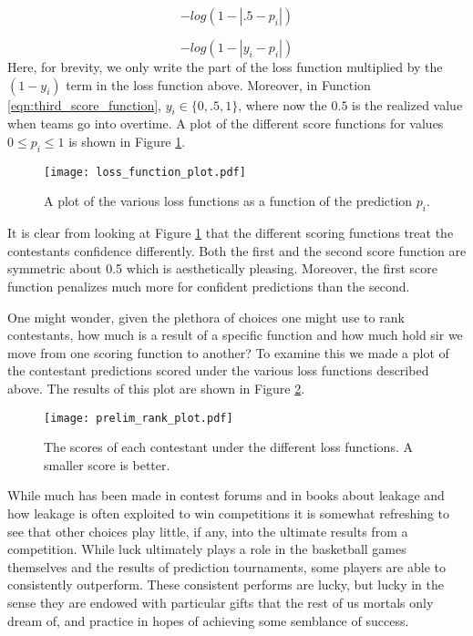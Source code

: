 \begin{equation}\label{eqn:second_score_function}
-log(1-|.5-p_i|)
\end{equation} 

\begin{equation}\label{eqn:third_score_function}
-log(1-|y_i-p_i|)
\end{equation} 
Here, for brevity, we only write the part of the loss function multiplied by the $(1-y_i)$ term in the loss function above. Moreover, in Function \ref{eqn:third_score_function}, $y_i \in \{0,.5,1\}$, where now the $0.5$ is the realized value when teams go into overtime. A plot of the different score functions for values $0\leq p_i \leq 1$ is shown in Figure \ref{fig:scoring_functions}.  

\begin{figure}[h]
\centering
\texttt{[image: loss\_function\_plot.pdf]}
\caption{A plot of the various loss functions as a function of the prediction $p_i$.  }
\label{fig:scoring_functions}
\end{figure}

It is clear from looking at Figure \ref{fig:scoring_functions} that the different scoring functions treat the contestants confidence differently. Both the first and the second score function are symmetric about 0.5 which is aesthetically pleasing. Moreover, the first score function penalizes much more for confident predictions than the second. 

One might wonder, given the plethora of choices one might use to rank contestants, how much is a result of a specific function and how much hold sir we move from one scoring function to another? To examine this we made a plot of the contestant predictions scored under the various loss functions described above. The results of this plot are shown in Figure \ref{fig:score_rank_plot}. 

  \begin{figure}[h]
\centering
\texttt{[image: prelim\_rank\_plot.pdf]}
\caption{The scores of each contestant under the different loss functions. A smaller score is better.  }
\label{fig:score_rank_plot}
\end{figure}


While much has been made in contest forums and in books \cite{schutt2013doing} about leakage and how leakage is often exploited to win competitions it is somewhat refreshing to see that other choices play little, if any, into the ultimate results from a competition. While luck ultimately plays a role in the basketball games themselves and the results of prediction tournaments, some players are able to consistently outperform. These consistent performs are lucky, but lucky in the sense they are endowed with particular gifts that the rest of us mortals only dream of, and practice in hopes of achieving some semblance of success.  